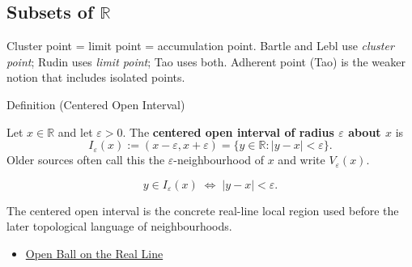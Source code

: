 
\subsection*{\texorpdfstring{Subsets of $\mathbb{R}$}{Subsets of R}}
\label{sec:subsets-of-R}
\begin{remark*}[Interpretation]
Cluster point = limit point = accumulation point. Bartle and Lebl use
\emph{cluster point}; Rudin uses \emph{limit point}; Tao uses both.
Adherent point (Tao) is the weaker notion that includes isolated points.
\end{remark*}


\begin{definitionbox}{Definition (Centered Open Interval)}
\begin{definition}
\label{def:epsilon-neighbourhood}
Let $x\in\mathbb{R}$ and let $\varepsilon>0$. The
\textbf{centered open interval of radius $\varepsilon$ about $x$} is
\[
  I_\varepsilon(x):=(x-\varepsilon,x+\varepsilon)
  =\{y\in\mathbb{R}: |y-x|<\varepsilon\}.
\]
Older sources often call this the $\varepsilon$-neighbourhood of $x$ and write
$V_\varepsilon(x)$.
\end{definition}
\end{definitionbox}

\begin{remark*}
\[
  y\in I_\varepsilon(x)\;\Longleftrightarrow\; |y-x|<\varepsilon.
\]
\end{remark*}

\begin{remark*}[Interpretation]
The centered open interval is the concrete real-line local region used before
the later topological language of neighbourhoods.
\end{remark*}

\begin{dependencies}
\begin{itemize}
  \item \hyperref[def:open-ball]{Open Ball on the Real Line}
\end{itemize}
\end{dependencies}

